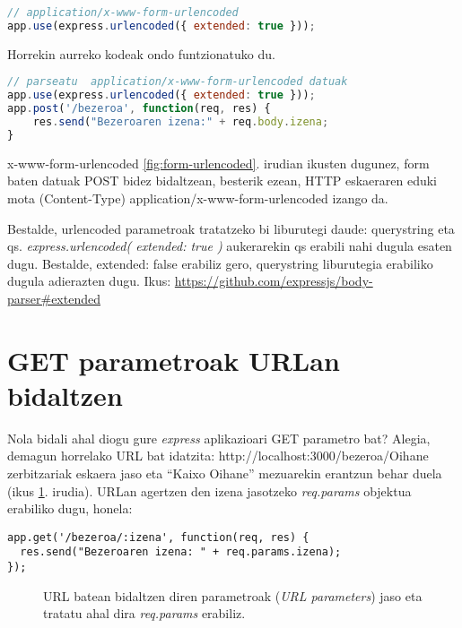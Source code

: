 \begin{lstlisting}[language=JavaScript]
// application/x-www-form-urlencoded
app.use(express.urlencoded({ extended: true }));

\end{lstlisting}

Horrekin aurreko kodeak ondo funtzionatuko du. 

\begin{lstlisting}[language=JavaScript]
// parseatu  application/x-www-form-urlencoded datuak
app.use(express.urlencoded({ extended: true }));
app.post('/bezeroa', function(req, res) {
    res.send("Bezeroaren izena:" + req.body.izena;
}
\end{lstlisting}

\begin{alertinfo}{x-www-form-urlencoded}
\ref{fig:form-urlencoded}. irudian ikusten dugunez, form baten datuak POST bidez bidaltzean, besterik ezean, HTTP eskaeraren eduki mota (Content-Type) application/x-www-form-urlencoded izango da.

Bestalde, urlencoded parametroak tratatzeko bi liburutegi daude: querystring eta qs. \textit{ express.urlencoded({ extended: true })} aukerarekin qs erabili nahi dugula esaten dugu. Bestalde, extended: false erabiliz gero, querystring liburutegia erabiliko dugula adierazten dugu. Ikus: \href{https://github.com/expressjs/body-parser\#extended}{https://github.com/expressjs/body-parser\#extended}
\end{alertinfo}

\section{GET parametroak URLan bidaltzen}

Nola bidali ahal diogu gure \textit{express} aplikazioari GET parametro bat? Alegia, demagun horrelako URL bat idatzita: http://localhost:3000/bezeroa/Oihane zerbitzariak eskaera jaso eta ``Kaixo Oihane'' mezuarekin erantzun behar duela (ikus \ref{fig:urlparametroak}. irudia). URLan agertzen den izena jasotzeko \textit{req.params} objektua erabiliko dugu, honela:

\begin{lstlisting}[numbers=none]
app.get('/bezeroa/:izena', function(req, res) {
  res.send("Bezeroaren izena: " + req.params.izena);
});
\end{lstlisting}

\begin{figure}[ht]
	\centering
{}
\caption{URL batean bidaltzen diren parametroak (\textit{URL parameters}) jaso eta tratatu ahal dira \textit{req.params} erabiliz.}
\label{fig:urlparametroak}
\end{figure}


